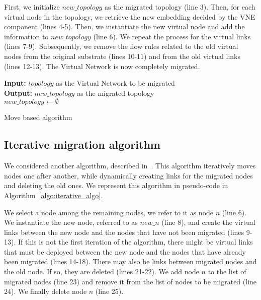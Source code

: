 First, we initialize $new\_topology$ as the migrated topology (line 3). Then, for each virtual node in the topology, we retrieve the new embedding decided by the VNE component (lines 4-5).
Then, we instantiate the new virtual node and add the information to $new\_topology$ (line 6).
We repeat the process for the virtual links (lines 7-9).
Subsequently, we remove the flow rules related to the old virtual nodes from the original substrate (lines 10-11) and from the old virtual links (lines 12-13).
The Virtual Network is now completely migrated.




\begin{algorithm}[ht]
\textbf{Input: }$topology$ as the Virtual Network to be migrated\\
\textbf{Output: } $new\_topology$ as the migrated topology\\
$new\_topology \gets \emptyset$\\
\caption{Move based algorithm}
\label{algo:move_algo}
\end{algorithm}


\subsection{Iterative migration algorithm}
We considered another algorithm, described in~\cite{vnm-lo2013}.
This algorithm iteratively moves nodes one after another, while dynamically creating links for the migrated nodes and deleting the old ones.
We represent this algorithm in pseudo-code in Algorithm~\ref{algo:iterative_algo}.

We select a node among the remaining nodes, we refer to it as node $n$ (line 6). We instantiate the new node, referred to as $new\_n$ (line 8), and create the virtual links between the new node and the nodes that have not been migrated (lines 9-13).
If this is not the first iteration of the algorithm, there might be virtual links that must be deployed between the new node and the nodes that have already been migrated (lines 14-18).
There may also be links between migrated nodes and the old node.
If so, they are deleted (lines 21-22).
We add node $n$ to the list of migrated nodes (line 23) and remove it from the list of nodes to be migrated (line 24). We finally delete node $n$ (line 25).

